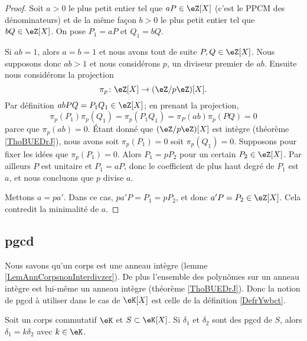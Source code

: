 \begin{proof}
    Soit \( a>0\) le plus petit entier tel que \( aP\in\eZ[X]\) (c'est le PPCM des dénominateurs) et de la même façon \( b>0\) le plus petit entier tel que \( bQ\in \eZ[X]\). On pose \( P_1=aP\) et \( Q_1=bQ\).

    Si \( ab=1\), alors \( a=b=1\) et nous avons tout de suite \( P,Q\in \eZ[X]\). Nous supposons donc \( ab>1\) et nous considérons \( p\), un diviseur premier de \( ab\). Ensuite nous considérons la projection
    \begin{equation}
        \pi_p\colon \eZ[X]\to (\eZ/p\eZ)[X].
    \end{equation}
    Par définition \( abPQ=P_1Q_1\in \eZ[X]\); en prenant la projection,
    \begin{equation}
        \pi_p(P_1)\pi_p(Q_1)=\pi_p(P_1Q_1)=\pi_P(ab)\pi_p(PQ)=0
    \end{equation}
    parce que \( \pi_p(ab)=0\). Étant donné que \( (\eZ/p\eZ)[X]\) est intègre (théorème \ref{ThoBUEDrJ}), nous avons soit \( \pi_p(P_1)=0\) soit \( \pi_p(Q_1)=0\). Supposons pour fixer les idées que \( \pi_p(P_1)=0\). Alors \( P_1=pP_2\) pour un certain \( P_2\in \eZ[X]\). Par ailleurs \( P\) est unitaire et \( P_1=aP\), donc le coefficient de plus haut degré de \( P_1\) est \( a\), et nous concluons que \( p\) divise \( a\).
    
    Mettons \( a=pa'\). Dans ce cas, \( pa'P=P_1=pP_2\), et donc \( a'P=P_2\in \eZ[X]\). Cela contredit la minimalité de \( a\).
\end{proof}

\subsection{pgcd}

Nous savons qu'un corps est une anneau intègre (lemme \ref{LemAnnCorpsnonInterdivzer}). De plus l'ensemble des polynômes sur un anneau intègre est lui-même un anneau intègre (théorème \ref{ThoBUEDrJ}). Donc la notion de pgcd à utiliser dans le cas de \( \eK[X]\) est celle de la définition \ref{DefrYwbct}.

\begin{lemma}      \label{LEMooXISOooNAMeVX}
    Soit un corps commutatif \( \eK\) et \( S\subset \eK[X]\). Si \( \delta_1\) et \( \delta_2\) sont des pgcd de \( S\), alors \( \delta_1=k\delta_2\) avec \( k\in \eK\).
\end{lemma}

